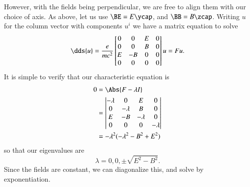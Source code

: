 {However, with the fields being perpendicular, we are free to align them with our choice of axis.  As above, let us use \(\BE = E \ycap\), and \(\BB = B \zcap\).  Writing \(u\) for the column vector with components \(u^i\) we have a matrix equation to solve
%
\begin{equation}\label{eqn:relElectroDynProblemSet2:530}
\dds{u} =
\frac{ e }{m c^2}
\begin{bmatrix}
0 & 0 & E & 0 \\
0 & 0 & B & 0 \\
E & -B & 0 & 0 \\
0 & 0 & 0 & 0
\end{bmatrix} u = F u.
\end{equation}
%
It is simple to verify that our characteristic equation is
%
\begin{equation}\label{eqn:relElectroDynProblemSet2:1190}
\begin{aligned}
0
&= \Abs{ F - \lambda I } \\
&= \begin{vmatrix}
-\lambda & 0 & E & 0 \\
0 & -\lambda & B & 0 \\
E & -B & -\lambda & 0 \\
0 & 0 & 0 & -\lambda
\end{vmatrix} \\
&= -\lambda^2 ( -\lambda^2 - B^2 + E^2 )
\end{aligned}
\end{equation}
%
so that our eigenvalues are
%
\begin{equation}\label{eqn:relElectroDynProblemSet2:550}
\lambda = 0, 0, \pm \sqrt{E^2 - B^2}.
\end{equation}
%
Since the fields are constant, we can diagonalize this, and solve by exponentiation.

}

